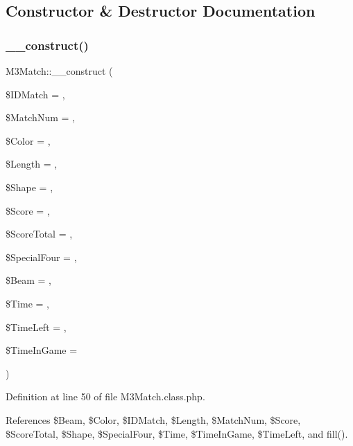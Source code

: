 \subsection{Constructor \& Destructor Documentation}
\mbox{\label{class_m3_match_a06f9baa07b235b5607b2376c2ef7726b}} 
\subsubsection{\texorpdfstring{\+\_\+\+\_\+construct()}{\_\_construct()}}
{\footnotesize\ttfamily M3\+Match\+::\+\_\+\+\_\+construct (\begin{DoxyParamCaption}\item[{}]{\$\+I\+D\+Match = {},  }\item[{}]{\$\+Match\+Num = {},  }\item[{}]{\$\+Color = {\ttfamily \textquotesingle{}\textquotesingle{}},  }\item[{}]{\$\+Length = {},  }\item[{}]{\$\+Shape = {\ttfamily \textquotesingle{}\textquotesingle{}},  }\item[{}]{\$\+Score = {},  }\item[{}]{\$\+Score\+Total = {},  }\item[{}]{\$\+Special\+Four = {\ttfamily \textquotesingle{}\textquotesingle{}},  }\item[{}]{\$\+Beam = {\ttfamily \textquotesingle{}\textquotesingle{}},  }\item[{}]{\$\+Time = {},  }\item[{}]{\$\+Time\+Left = {},  }\item[{}]{\$\+Time\+In\+Game = {} }\end{DoxyParamCaption})}



Definition at line 50 of file M3\+Match.\+class.\+php.



References \$\+Beam, \$\+Color, \$\+I\+D\+Match, \$\+Length, \$\+Match\+Num, \$\+Score, \$\+Score\+Total, \$\+Shape, \$\+Special\+Four, \$\+Time, \$\+Time\+In\+Game, \$\+Time\+Left, and fill().

